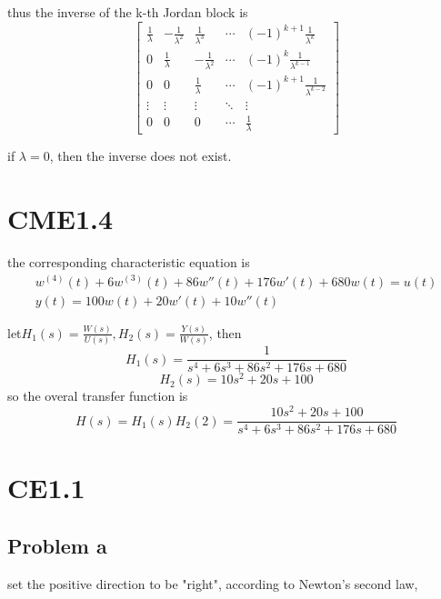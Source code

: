 \documentclass[12pt,a4paper]{article}
\begin{document}
thus the inverse of the k-th Jordan block is
\[
    \begin{bmatrix}
        \frac{1}{\lambda} &- \frac{1}{\lambda^2} & \frac{1}{\lambda^3} & \cdots & (-1)^{k+1} \frac{1}{\lambda^{k}} \\
        0                 & \frac{1}{\lambda}     & -\frac{1}{\lambda^2} & \cdots & (-1)^{k} \frac{1}{\lambda^{k-1}} \\
        0                 & 0                     & \frac{1}{\lambda}     & \cdots & (-1)^{k+1} \frac{1}{\lambda^{k-2}} \\
        \vdots            & \vdots                & \vdots                & \ddots & \vdots \\
        0                 & 0                     & 0                     & \cdots & \frac{1}{\lambda}
    \end{bmatrix}
\]

if $\lambda = 0$, then the inverse does not exist.

\section{CME1.4}
the corresponding characteristic equation is
\[
\begin{aligned}
    w^{(4)}(t) + 6w^{(3)}(t) + 86w''(t) + 176w'(t) + 680w(t) = u(t) \\
    y(t) = 100w(t) + 20w'(t)+10w''(t)
\end{aligned}
\]

let$H_1(s)=\frac{W(s)}{U(s)}, H_2(s) = \frac{Y(s)}{W(s)}$,
then 
\[
    H_1(s) = \frac{1}{s^4+6s^3+86s^2+176s+680}
\]
\[ 
    H_2(s) = 10s^2+20s+100
\]
so the overal transfer function is
\[
    H(s) = H_1(s)H_2(2)= \frac{10s^2+20s+100}{s^4+6s^3+86s^2+176s+680}
\]

\section{CE1.1}
\subsection*{Problem a}
set the positive direction to be "right",
according to Newton's second law,
\end{document}
